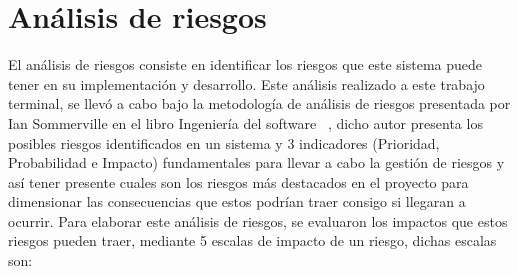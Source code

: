 \section{Análisis de riesgos} 

El análisis de riesgos consiste en identificar los riesgos que este sistema puede tener en su implementación y desarrollo. Este análisis realizado a este trabajo terminal, se llevó a cabo bajo la metodología de análisis de riesgos presentada por Ian Sommerville en el libro Ingeniería del software ~\cite{sommerville}, dicho autor presenta los posibles riesgos identificados en un sistema y 3 indicadores (Prioridad, Probabilidad e Impacto) fundamentales para llevar a cabo la gestión de riesgos y así tener presente cuales son los riesgos más destacados en el proyecto para dimensionar las consecuencias que estos podrían traer consigo si llegaran a ocurrir. Para elaborar este análisis de riesgos, se evaluaron los impactos que estos riesgos pueden traer, mediante 5 escalas de impacto de un riesgo, dichas escalas son: 

